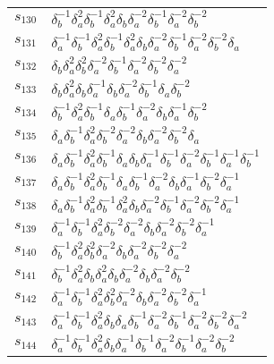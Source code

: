 \documentclass{article}
\begin{document}
\begin{center}
\begin{tabular}{ll}
$s_{130}$ & $\delta_b^{-1}\delta_a^{2}\delta_b^{-1}\delta_a^{2}\delta_b^{}\delta_a^{-2}\delta_b^{-1}\delta_a^{-2}\delta_b^{-2}$ \\
$s_{131}$ & $\delta_a^{-1}\delta_b^{-1}\delta_a^{2}\delta_b^{-1}\delta_a^{2}\delta_b^{}\delta_a^{-2}\delta_b^{-1}\delta_a^{-2}\delta_b^{-2}\delta_a^{}$ \\
$s_{132}$ & $\delta_b^{}\delta_a^{2}\delta_b^{2}\delta_a^{-2}\delta_b^{-1}\delta_a^{-2}\delta_b^{-2}\delta_a^{-2}$ \\
$s_{133}$ & $\delta_b^{}\delta_a^{2}\delta_b^{}\delta_a^{-1}\delta_b^{}\delta_a^{-2}\delta_b^{-1}\delta_a^{}\delta_b^{-2}$ \\
$s_{134}$ & $\delta_b^{-1}\delta_a^{2}\delta_b^{-1}\delta_a^{}\delta_b^{-1}\delta_a^{-2}\delta_b^{}\delta_a^{-1}\delta_b^{-2}$ \\
$s_{135}$ & $\delta_a^{}\delta_b^{-1}\delta_a^{2}\delta_b^{-2}\delta_a^{-2}\delta_b^{}\delta_a^{-2}\delta_b^{-2}\delta_a^{}$ \\
$s_{136}$ & $\delta_a^{}\delta_b^{-1}\delta_a^{2}\delta_b^{-1}\delta_a^{}\delta_b^{}\delta_a^{-1}\delta_b^{-1}\delta_a^{-2}\delta_b^{-1}\delta_a^{-1}\delta_b^{-1}$ \\
$s_{137}$ & $\delta_a^{}\delta_b^{-1}\delta_a^{2}\delta_b^{-1}\delta_a^{}\delta_b^{-1}\delta_a^{-2}\delta_b^{}\delta_a^{-1}\delta_b^{-2}\delta_a^{-1}$ \\
$s_{138}$ & $\delta_a^{}\delta_b^{-1}\delta_a^{2}\delta_b^{-1}\delta_a^{2}\delta_b^{}\delta_a^{-2}\delta_b^{-1}\delta_a^{-2}\delta_b^{-2}\delta_a^{-1}$ \\
$s_{139}$ & $\delta_a^{-1}\delta_b^{-1}\delta_a^{2}\delta_b^{-2}\delta_a^{-2}\delta_b^{}\delta_a^{-2}\delta_b^{-2}\delta_a^{-1}$ \\
$s_{140}$ & $\delta_b^{-1}\delta_a^{2}\delta_b^{2}\delta_a^{-2}\delta_b^{}\delta_a^{-2}\delta_b^{-2}\delta_a^{-2}$ \\
$s_{141}$ & $\delta_b^{-1}\delta_a^{2}\delta_b^{}\delta_a^{2}\delta_b^{}\delta_a^{-2}\delta_b^{}\delta_a^{-2}\delta_b^{-2}$ \\
$s_{142}$ & $\delta_a^{-1}\delta_b^{-1}\delta_a^{2}\delta_b^{2}\delta_a^{-2}\delta_b^{}\delta_a^{-2}\delta_b^{-2}\delta_a^{-1}$ \\
$s_{143}$ & $\delta_a^{-1}\delta_b^{-1}\delta_a^{2}\delta_b^{}\delta_a^{}\delta_b^{-1}\delta_a^{-2}\delta_b^{-1}\delta_a^{-2}\delta_b^{-2}\delta_a^{-2}$ \\
$s_{144}$ & $\delta_a^{-1}\delta_b^{-1}\delta_a^{2}\delta_b^{}\delta_a^{-1}\delta_b^{-1}\delta_a^{-2}\delta_b^{-1}\delta_a^{-2}\delta_b^{-2}$ \\

\end{tabular}
\end{center}
\end{document}
